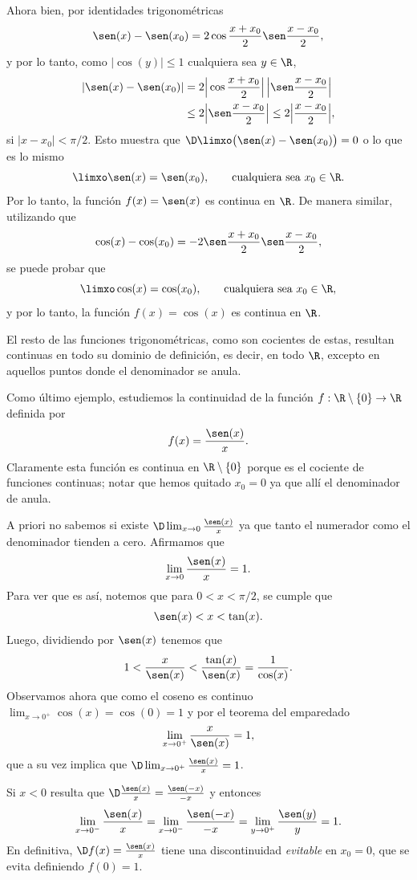 Ahora bien, por identidades trigonométricas
\[
\sen(x)-\sen(x_0) = 2 \cos\frac{x+x_0}2 \sen\frac{x-x_0}2,
\]
y por lo tanto, como $|\cos(y)|\le 1$ cualquiera sea $y\in\R$,
\begin{align*}
|\sen(x)-\sen(x_0)| 
&= 2 \Big|\cos\frac{x+x_0}2\Big| \, \Big|\sen\frac{x-x_0}2\Big|
\\
&\le 2 \Big|\sen\frac{x-x_0}2\Big| 
\le 2 \Big|\frac{x-x_0}2\Big| ,
\end{align*}
si $|x-x_0|<\pi/2$. Esto muestra que $\D\limxo \big(\sen(x)-\sen(x_0)\big)=0$ o lo que es lo mismo 
\[
\limxo \sen(x)=\sen(x_0), \qquad \text{cualquiera sea $x_0\in\R$}.
\]
Por lo tanto, la función $f(x)=\sen(x)$ es continua en $\R$.
De manera similar, utilizando que
\[
\cos(x)-\cos(x_0) = -2 \sen\frac{x+x_0}2 \sen\frac{x-x_0}2,
\]
se puede probar que 
\[
\limxo \cos(x)=\cos(x_0), \qquad \text{cualquiera sea $x_0\in\R$},
\]
y por lo tanto, la función $f(x)=\cos(x)$ es continua en $\R$.

El resto de las funciones trigonométricas, como son cocientes de estas, resultan continuas en todo su dominio de definición, es decir, en todo $\R$, excepto en aquellos puntos donde el denominador se anula.

Como último ejemplo, estudiemos la continuidad de la función $f:\R\setminus\{0\}\to\R$ definida por
\[
f(x)=\frac{\sen(x)}{x}.
\]
Claramente esta función es continua en $\R\setminus\{0\}$ porque es el cociente de funciones continuas; notar que hemos quitado $x_0=0$ ya que allí el denominador de anula.

A priori no sabemos si existe $\D\lim_{x\to0}\frac{\sen(x)}{x}$ ya que tanto el numerador como el denominador tienden a cero.
Afirmamos que
\[
\lim_{x\to0}\frac{\sen(x)}{x}=1.
\]
Para ver que es así, notemos que para $0<x<\pi/2$, se cumple que 
\[
\sen(x)<x<\tan (x).
\]
Luego, dividiendo por $\sen(x)$ tenemos que
\[
1<\frac{x}{\sen(x)} < \frac{\tan(x)}{\sen(x)} = \frac{1}{\cos(x)}.
\]
Observamos ahora que como el coseno es continuo $\lim_{x\to 0^+}\cos(x)=\cos(0)=1$ y por el teorema del emparedado
\[
\lim_{x\to0^+}\frac{x}{\sen(x)}=1,
\]
que a su vez implica que $\D \lim_{x\to0^+}\frac{\sen(x)}{x}=1$.

Si $x<0$ resulta que $\D \frac{\sen(x)}{x} = \frac{\sen(-x)}{-x}$ y entonces
\[
\lim_{x\to0^-}\frac{\sen(x)}{x}
=\lim_{x\to0^-}\frac{\sen(-x)}{-x}
=\lim_{y\to0^+}\frac{\sen(y)}{y}=1.
\]
En definitiva, $\D f(x)=\frac{\sen(x)}{x}$ tiene una discontinuidad \emph{evitable} en $x_0=0$, que se evita definiendo $f(0)=1$.


